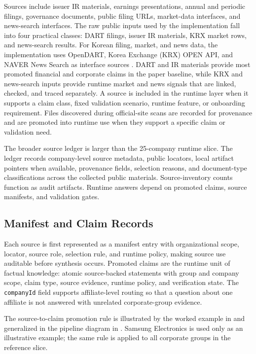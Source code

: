 Sources include issuer IR materials, earnings presentations, annual and periodic filings, governance documents, public filing URLs, market-data interfaces, and news-search interfaces. The raw public inputs used by the implementation fall into four practical classes: DART filings, issuer IR materials, KRX market rows, and news-search results. For Korean filing, market, and news data, the implementation uses OpenDART, Korea Exchange (KRX) OPEN API, and NAVER News Search as interface sources \citep{opendart2026api,krx2026openapi,naver2026newssearch}. DART and IR materials provide most promoted financial and corporate claims in the paper baseline, while KRX and news-search inputs provide runtime market and news signals that are linked, checked, and traced separately. A source is included in the runtime layer when it supports a claim class, fixed validation scenario, runtime feature, or onboarding requirement. Files discovered during official-site scans are recorded for provenance and are promoted into runtime use when they support a specific claim or validation need.

The broader source ledger is larger than the 25-company runtime slice. The ledger records company-level source metadata, public locators, local artifact pointers when available, provenance fields, selection reasons, and document-type classifications across the collected public materials. Source-inventory counts function as audit artifacts. Runtime answers depend on promoted claims, source manifests, and validation gates.

\subsection{Manifest and Claim Records}

Each source is first represented as a manifest entry with organizational scope, locator, source role, selection rule, and runtime policy, making source use auditable before synthesis occurs. Promoted claims are the runtime unit of factual knowledge: atomic source-backed statements with group and company scope, claim type, source evidence, runtime policy, and verification state. The \texttt{companyId} field supports affiliate-level routing so that a question about one affiliate is not answered with unrelated corporate-group evidence.

The source-to-claim promotion rule is illustrated by the worked example in  and generalized in the pipeline diagram in . Samsung Electronics is used only as an illustrative example; the same rule is applied to all corporate groups in the reference slice.

